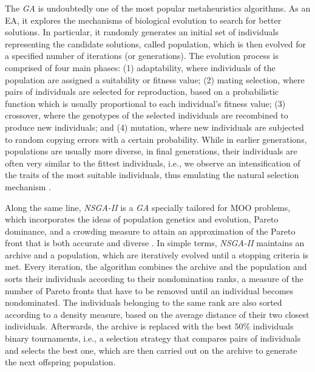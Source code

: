 	The \textit{\ac{GA}} is undoubtedly one of the most popular metaheuristics algorithms. As an \ac{EA}, it explores the mechanisms of biological evolution to search for better solutions. In particular, it randomly generates an initial set of individuals representing the candidate solutions, called population, which is then evolved for a specified number of iterations (or generations). The evolution process is comprised of four main phases: (1) adaptability, where individuals of the population are assigned a suitability or fitness value; (2) mating selection, where pairs of individuals are selected for reproduction, based on a probabilistic function which is usually proportional to each individual's fitness value; (3) crossover, where the genotypes of the selected individuals are recombined to produce new individuals; and (4) mutation, where new individuals are subjected to random copying errors with a certain probability. While in earlier generations, populations are usually more diverse, in final generations, their individuals are often very similar to the fittest individuals, i.e., we observe an intensification of the traits of the most suitable individuals, thus emulating the natural selection mechanism \cite{Brownlee2011}. %
	
	Along the same line, \textit{\ac{NSGA-II}} is a \textit{\ac{GA}} specially tailored for \ac{MOO} problems, which incorporates the ideas of population genetics and evolution, Pareto dominance, and a crowding measure to attain an approximation of the Pareto front that is both accurate and diverse \cite{Deb2002}. In simple terms, \textit{\ac{NSGA-II}} maintains an archive and a population, which are iteratively evolved until a stopping criteria is met. Every iteration, the algorithm combines the archive and the population and sorts their individuals according to their nondomination ranks, a measure of the number of Pareto fronts that have to be removed until an individual becomes nondominated. The individuals belonging to the same rank are also sorted according to a density measure, based on the average distance of their two closest individuals. Afterwards, the archive is replaced with the best $50\%$ individuals binary tournaments, i.e., a selection strategy that compares pairs of individuals and selects the best one, which are then carried out on the archive to generate the next offspring population. 

